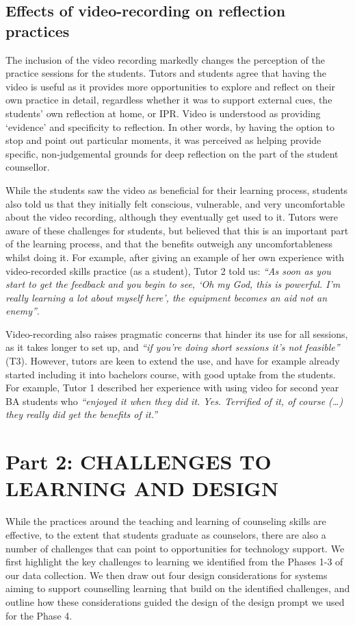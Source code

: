 \documentclass{sigchi}
\newcommand{\qq}[2]{\textrm{\textit{``#2''}}}
\begin{document}
\subsection{Effects of video-recording on reflection practices}
The inclusion of the video recording markedly changes the perception of the practice sessions for the students. Tutors and students agree that having the video is useful as it provides more opportunities to explore and reflect on their own practice in detail, regardless whether it was to support external cues, the students' own reflection at home, or IPR. Video is understood as providing `evidence' and specificity to reflection. In other words, by having the option to stop and point out particular moments, it was perceived as helping provide specific, non-judgemental grounds for deep reflection on the part of the student counsellor. 

While the students saw the video as beneficial for their learning process, students also told us that they initially felt conscious, vulnerable, and very uncomfortable about the video recording, although they eventually get used to it. Tutors were aware of these challenges for students, but believed that this is an important part of the learning process, and that the benefits outweigh any uncomfortableness whilst doing it. For example, after giving an example of her own experience with video-recorded skills practice (as a student), Tutor 2 told us: \qq{}{As soon as you start to get the feedback and you begin to see, `Oh my God, this is powerful. I'm really learning a lot about myself here', the equipment becomes an aid not an enemy}. 

Video-recording also raises pragmatic concerns that hinder its use for all sessions, as it takes longer to set up, and \qq{}{if you're doing short sessions it's not feasible} (T3). However, tutors are keen to extend the use, and have for example already started including it into bachelors course, with good uptake from the students. For example, Tutor 1 described her experience with using video for second year BA students who \qq{}{enjoyed it when they did it. Yes. Terrified of it, of course (…) they really did get the benefits of it.}



\section{Part 2: CHALLENGES TO LEARNING AND DESIGN}
While the practices around the teaching and learning of counseling skills are effective, to the extent that students graduate as counselors, there are also a number of challenges that can point to opportunities for technology support. We first highlight the key challenges to learning we identified from the Phases 1-3 of our data collection. We then draw out four design considerations for systems aiming to support counselling learning that build on the identified challenges, and outline how these considerations guided the design of the design prompt we used for the Phase 4. 
\end{document}
